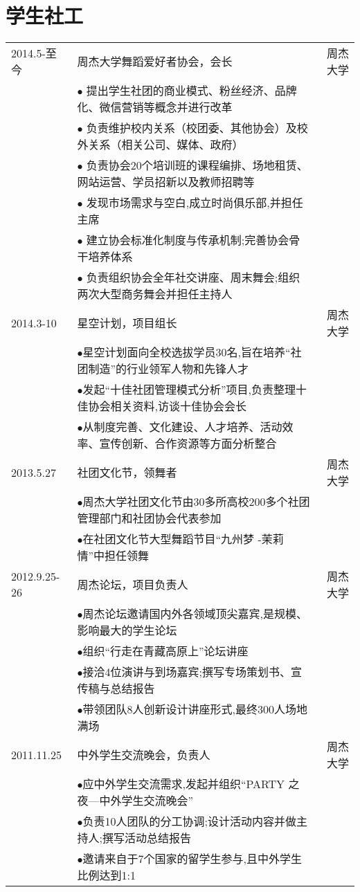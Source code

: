 \documentclass[a4paper]{article} %
\begin{document}
\section{学生社工}

	
\begin{tabular}{llr}
	\rowcolor{mypink}
	2014.5-至今& 周杰大学舞蹈爱好者协会，会长&周杰大学\\   
 & $\bullet$ 提出学生社团的商业模式、粉丝经济、品牌化、微信营销等概念并进行改革&\\
 & $\bullet$ 负责维护校内关系（校团委、其他协会）及校外关系（相关公司、媒体、政府）&\\
 & $\bullet$ 负责协会20个培训班的课程编排、场地租赁、网站运营、学员招新以及教师招聘等&\\
 & $\bullet$ 发现市场需求与空白,成立时尚俱乐部,并担任主席&\\
 & $\bullet$ 建立协会标准化制度与传承机制;完善协会骨干培养体系&\\
 & $\bullet$ 负责组织协会全年社交讲座、周末舞会;组织两次大型商务舞会并担任主持人&\\

	\rowcolor{mypink}
2014.3-10&星空计划，项目组长&周杰大学\\
 & $\bullet$星空计划面向全校选拔学员30名,旨在培养“社团制造”的行业领军人物和先锋人才&\\
 & $\bullet$发起“十佳社团管理模式分析”项目,负责整理十佳协会相关资料,访谈十佳协会会长&\\
 & $\bullet$从制度完善、文化建设、人才培养、活动效率、宣传创新、合作资源等方面分析整合&\\


	\rowcolor{mypink}
2013.5.27&社团文化节，领舞者&周杰大学\\
 & $\bullet$周杰大学社团文化节由30多所高校200多个社团管理部门和社团协会代表参加&\\
 & $\bullet$在社团文化节大型舞蹈节目“九州梦 -茉莉情”中担任领舞&\\


	\rowcolor{mypink}
2012.9.25-26&周杰论坛，项目负责人&周杰大学\\
 & $\bullet$周杰论坛邀请国内外各领域顶尖嘉宾,是规模、影响最大的学生论坛&\\
 & $\bullet$组织“行走在青藏高原上”论坛讲座&\\
 & $\bullet$接洽4位演讲与到场嘉宾;撰写专场策划书、宣传稿与总结报告&\\
 & $\bullet$带领团队8人创新设计讲座形式,最终300人场地满场&\\

	\rowcolor{mypink}
2011.11.25&中外学生交流晚会，负责人&周杰大学\\
 & $\bullet$应中外学生交流需求,发起并组织“PARTY 之夜—中外学生交流晚会”&\\
 & $\bullet$负责10人团队的分工协调;设计活动内容并做主持人;撰写活动总结报告&\\
 & $\bullet$邀请来自于7个国家的留学生参与,且中外学生比例达到1:1&\\


\end{tabular}
\end{document}
